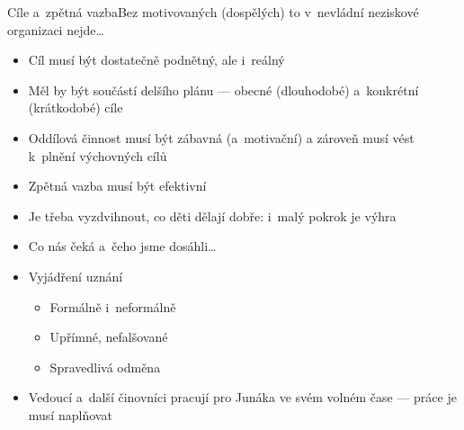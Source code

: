 \documentclass[compress, ucs, xelatex, xcolor=dvipsnames, print,
  hyperref={
    bookmarks=true,
    unicode=true,
    colorlinks=true,
    plainpages=false,
    pdfkeywords={Junak, Pedagogika, Skaut, Skauting, Vychovna metoda},
    linkcolor=Black,
    anchorcolor=Black,
    citecolor=OliveGreen,
    filecolor=OliveGreen,
    menucolor=Black,
    urlcolor=OliveGreen,
    pdftex}
  ]{beamer}
\begin{document}
\begin{frame}{Cíle a~zpětná vazba}{Bez motivovaných (dospělých) to v~nevládní neziskové organizaci nejde\ldots}
  \begin{multicols}{2}
    \begin{itemize}
      \item Cíl musí být dostatečně podnětný, ale i~reálný
      \item Měl by být součástí delšího plánu --- obecné (dlouhodobé) a~konkrétní (krátkodobé) cíle
      \item Oddílová činnost musí být zábavná (a~motivační) a zároveň musí vést k~plnění výchovných cílů
      \item Zpětná vazba musí být efektivní
      \item Je třeba vyzdvihnout, co děti dělají dobře: i~malý pokrok je výhra
      \item Co nás čeká a~čeho jsme dosáhli\ldots
      \item Vyjádření uznání
      \begin{itemize}
	\item Formálně i~neformálně
	\item Upřímné, nefalšované
	\item Spravedlivá odměna
      \end{itemize}
    \end{itemize}
  \end{multicols}
  \begin{itemize}
    \item Vedoucí a~další činovníci pracují pro Junáka ve svém volném čase --- práce je musí naplňovat
  \end{itemize}
\end{frame}
\end{document}

